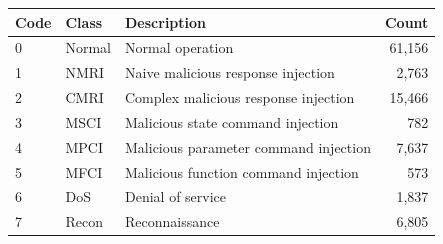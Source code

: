 \begin{tabular}{lllr}
\toprule
Code & Class & Description & Count \\
\midrule
0 & Normal & Normal operation & 61,156 \\
1 & NMRI & Naive malicious response injection & 2,763 \\
2 & CMRI & Complex malicious response injection & 15,466 \\
3 & MSCI & Malicious state command injection & 782 \\
4 & MPCI & Malicious parameter command injection & 7,637 \\
5 & MFCI & Malicious function command injection & 573 \\
6 & DoS & Denial of service & 1,837 \\
7 & Recon & Reconnaissance & 6,805 \\
\bottomrule
\end{tabular}
